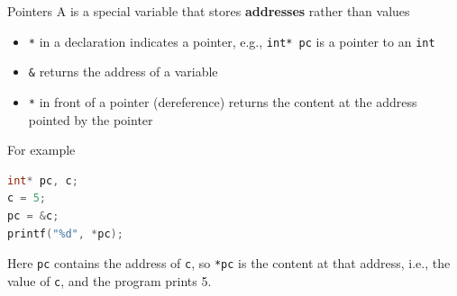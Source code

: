 \begin{parag}{Pointers}
    A  is a special variable that stores \textbf{addresses} rather than values
    \begin{itemize}
        \item \texttt{*} in a declaration indicates a pointer, e.g., \texttt{int* pc} is a pointer to an \texttt{int}
        \item \texttt{\&} returns the address of a variable
        \item \texttt{*} in front of a pointer (dereference) returns the content at the address pointed by the pointer
    \end{itemize}
    For example
    \begin{lstlisting}[language=C]
int* pc, c;
c = 5;
pc = &c;
printf("%d", *pc);
    \end{lstlisting}
    Here \texttt{pc} contains the address of \texttt{c}, so \texttt{*pc} is the content at that address, i.e., the value of \texttt{c}, and the program prints 5.
\end{parag}

